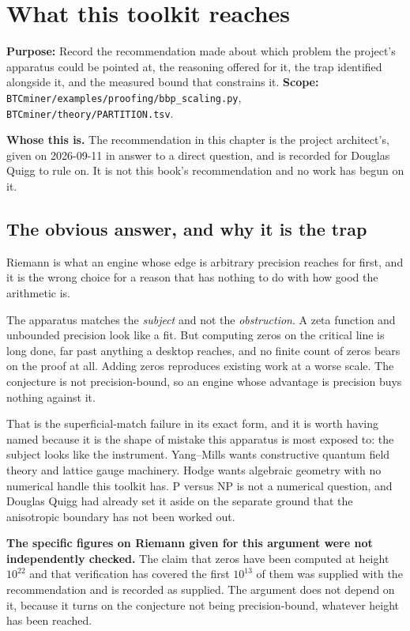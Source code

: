 \chapter{What this toolkit reaches}

\textbf{Purpose:} Record the recommendation made about which problem the project's apparatus could
be pointed at, the reasoning offered for it, the trap identified alongside it, and the measured
bound that constrains it. \textbf{Scope:}
\texttt{BTCminer/\allowbreak{}examples/\allowbreak{}proofing/\allowbreak{}bbp\_\allowbreak{}scaling.\allowbreak{}py},
\texttt{BTCminer/\allowbreak{}theory/\allowbreak{}PARTITION.\allowbreak{}tsv}.

\textbf{Whose this is.} The recommendation in this chapter is the project architect's, given on
2026-09-11 in answer to a direct question, and is recorded for Douglas Quigg to rule on. It is not
this book's recommendation and no work has begun on it.

\section{The obvious answer, and why it is the trap}

Riemann is what an engine whose edge is arbitrary precision reaches for first, and it is the wrong
choice for a reason that has nothing to do with how good the arithmetic is.

The apparatus matches the \emph{subject} and not the \emph{obstruction}. A zeta function and
unbounded precision look like a fit. But computing zeros on the critical line is long done, far past
anything a desktop reaches, and no finite count of zeros bears on the proof at all. Adding zeros
reproduces existing work at a worse scale. The conjecture is not precision-bound, so an engine
whose advantage is precision buys nothing against it.

That is the superficial-match failure in its exact form, and it is worth having named because it is
the shape of mistake this apparatus is most exposed to: the subject looks like the instrument.
Yang--Mills wants constructive quantum field theory and lattice gauge machinery. Hodge wants
algebraic geometry with no numerical handle this toolkit has. P versus NP is not a numerical
question, and Douglas Quigg had already set it aside on the separate ground that the anisotropic
boundary has not been worked out.

\textbf{The specific figures on Riemann given for this argument were not independently checked.}
The claim that zeros have been computed at height $10^{22}$ and that verification has covered the
first $10^{13}$ of them was supplied with the recommendation and is recorded as supplied. The
argument does not depend on it, because it turns on the conjecture not being precision-bound,
whatever height has been reached.

